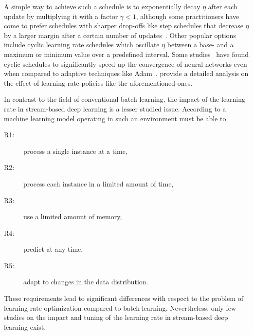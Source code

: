 \documentclass[letterpaper]{article} %
\begin{document}
A simple way to achieve such a schedule is to exponentially decay $\eta$ after each update by multiplying it with a factor $\gamma < 1$, although some practitioners have come to prefer schedules with sharper drop-offs like step schedules that decrease $\eta$ by a larger margin after a certain number of updates~\cite{smithDonDecayLearning2018}.
Other popular options include cyclic learning rate schedules which oscillate  $\eta$ between a base- and a maximum or minimum value over a predefined interval.
Some studies~\cite{smithCyclicalLearningRates2017, smithSuperConvergenceVeryFast2018a} have found cyclic schedules to significantly speed up the convergence of neural networks even when compared to adaptive techniques like Adam~\cite{kingmaAdamMethodStochastic2017b}.
 provide a detailed analysis on the effect of learning rate policies like the aforementioned ones.

In contrast to the field of conventional batch learning, the impact of the learning rate in stream-based deep learning is a lesser studied issue. According to \citet{bifetMOAMassiveOnline2010} a machine learning model operating in such an environment must be able to
\begin{center}
	\begin{varwidth}{0.5\textwidth}
		\begin{description}
			\item[R1:] process a single instance at a time,\label{rq:single_instance}
			\item[R2:] process each instance in a limited amount of time,\label{rq:limited_time}
			\item[R3:] use a limited amount of memory,\label{rq:limited_memory}
			\item[R4:] predict at any time,\label{rq:predict_any_time}
			\item[R5:] adapt to changes in the data distribution.\label{rq:adapt_to_drift}
		\end{description}
	\end{varwidth}
\end{center}
These requirements lead to significant differences with respect to the problem of learning rate optimization compared to batch learning.
Nevertheless, only few studies on the impact and tuning of the learning rate in stream-based deep learning exist.
\end{document}
